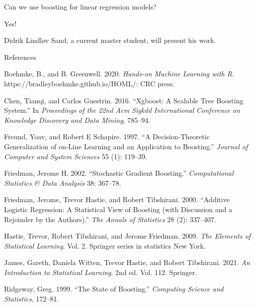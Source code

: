 \documentclass[
  10pt,
  ignorenonframetext,
]{beamer}
\newlength{\cslhangindent}
\newlength{\cslentryspacingunit} %
\newenvironment{CSLReferences}[2] %
 {%
  \setlength{\parindent}{0pt}
  \ifodd #1
  \let\oldpar\par
  \def\par{\hangindent=\cslhangindent\oldpar}
  \fi
  \setlength{\parskip}{#2\cslentryspacingunit}
 }%
 {}
\begin{document}
\begin{frame}{Can we use boosting for linear regression models?}
\protect\hypertarget{can-we-use-boosting-for-linear-regression-models}{}
\(~\)

Yes!

Didrik Lindløv Sand, a current master student, will present his work.
\end{frame}

\begin{frame}{References}
\protect\hypertarget{references}{}
\tiny

\hypertarget{refs}{}
\begin{CSLReferences}{1}{0}
\leavevmode{}%
Boehmke, B., and B. Greenwell. 2020. \emph{Hands-on Machine Learning
with {R}}. https://bradleyboehmke.github.io/HOML/: CRC press.

\leavevmode{}%
Chen, Tianqi, and Carlos Guestrin. 2016. {``Xgboost: A Scalable Tree
Boosting System.''} In \emph{Proceedings of the 22nd Acm Sigkdd
International Conference on Knowledge Discovery and Data Mining},
785--94.

\leavevmode{}%
Freund, Yoav, and Robert E Schapire. 1997. {``A Decision-Theoretic
Generalization of on-Line Learning and an Application to Boosting.''}
\emph{Journal of Computer and System Sciences} 55 (1): 119--39.

\leavevmode{}%
Friedman, Jerome H. 2002. {``Stochastic Gradient Boosting.''}
\emph{Computational Statistics \& Data Analysis} 38: 367--78.

\leavevmode{}%
Friedman, Jerome, Trevor Hastie, and Robert Tibshirani. 2000.
{``Additive Logistic Regression: A Statistical View of Boosting (with
Discussion and a Rejoinder by the Authors).''} \emph{The Annals of
Statistics} 28 (2): 337--407.

\leavevmode{}%
Hastie, Trevor, Robert Tibshirani, and Jerome Friedman. 2009. \emph{The
Elements of Statistical Learning}. Vol. 2. Springer series in statistics
New York.

\leavevmode{}%
James, Gareth, Daniela Witten, Trevor Hastie, and Robert Tibshirani.
2021. \emph{An Introduction to Statistical Learning}. 2nd ed. Vol. 112.
Springer.

\leavevmode{}%
Ridgeway, Greg. 1999. {``The State of Boosting.''} \emph{Computing
Science and Statistics}, 172--81.

\end{CSLReferences}
\end{frame}
\end{document}
